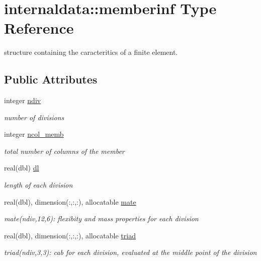 \hypertarget{structinternaldata_1_1memberinf}{}\section{internaldata\+:\+:memberinf Type Reference}
\label{structinternaldata_1_1memberinf}


structure containing the caracteritics of a finite element.  


\subsection*{Public Attributes}
\begin{DoxyCompactItemize}
\item 
integer \hyperlink{structinternaldata_1_1memberinf_a2af474d1d2e3a33ab9b4c932575a2294}{ndiv}
\begin{DoxyCompactList}\small\item\em number of divisions \end{DoxyCompactList}\item 
integer \hyperlink{structinternaldata_1_1memberinf_abff7a37a6411bc3bd96131bfccf98e91}{ncol\+\_\+memb}
\begin{DoxyCompactList}\small\item\em total number of columns of the member \end{DoxyCompactList}\item 
real(dbl) \hyperlink{structinternaldata_1_1memberinf_ace9954daa2b77364ae4984df951fa4d3}{dl}
\begin{DoxyCompactList}\small\item\em length of each division \end{DoxyCompactList}\item 
real(dbl), dimension(\+:,\+:,\+:), allocatable \hyperlink{structinternaldata_1_1memberinf_a992b8e0a6f7e01d33329d4cf9ee5737f}{mate}
\begin{DoxyCompactList}\small\item\em mate(ndiv,12,6)\+: flexibity and mass properties for each division \end{DoxyCompactList}\item 
real(dbl), dimension(\+:,\+:,\+:), allocatable \hyperlink{structinternaldata_1_1memberinf_aedb5a98d6a0011605f5458f065019a01}{triad}
\begin{DoxyCompactList}\small\item\em triad(ndiv,3,3)\+: cab for each division, evaluated at the middle point of the division \end{DoxyCompactList}\item 

\end{DoxyCompactItemize}
